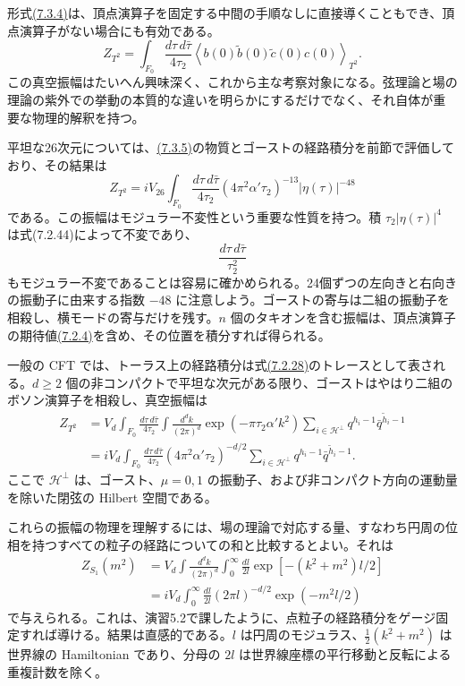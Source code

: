 形式\hyperref[eq:7.3.4]{(7.3.4)}は、頂点演算子を固定する中間の手順なしに直接導くこともでき、頂点演算子がない場合にも有効である。
\begin{equation}
Z_{T^2}
=\int_{F_0}\frac{d\tau\,d\bar\tau}{4\tau_2}
\left\langle b(0)\tilde b(0)\tilde c(0)c(0)\right\rangle_{T^2}.
\tag{7.3.5}\label{eq:7.3.5}
\end{equation}
この真空振幅はたいへん興味深く、これから主な考察対象になる。弦理論と場の理論の紫外での挙動の本質的な違いを明らかにするだけでなく、それ自体が重要な物理的解釈を持つ。

平坦な26次元については、\hyperref[eq:7.3.5]{(7.3.5)}の物質とゴーストの経路積分を前節で評価しており、その結果は
\begin{equation}
Z_{T^2}=iV_{26}\int_{F_0}\frac{d\tau\,d\bar\tau}{4\tau_2}
(4\pi^2\alpha'\tau_2)^{-13}|\eta(\tau)|^{-48}
\tag{7.3.6}\label{eq:7.3.6}
\end{equation}
である。この振幅はモジュラー不変性という重要な性質を持つ。積 $\tau_2|\eta(\tau)|^4$ は式(7.2.44)によって不変であり、
\begin{equation}
\frac{d\tau\,d\bar\tau}{\tau_2^2}
\tag{7.3.7}\label{eq:7.3.7}
\end{equation}
もモジュラー不変であることは容易に確かめられる。24個ずつの左向きと右向きの振動子に由来する指数 $-48$ に注意しよう。ゴーストの寄与は二組の振動子を相殺し、横モードの寄与だけを残す。$n$ 個のタキオンを含む振幅は、頂点演算子の期待値\hyperref[eq:7.2.4]{(7.2.4)}を含め、その位置を積分すれば得られる。

一般の CFT では、トーラス上の経路積分は式\hyperref[eq:7.2.28]{(7.2.28)}のトレースとして表される。$d\geq2$ 個の非コンパクトで平坦な次元がある限り、ゴーストはやはり二組のボソン演算子を相殺し、真空振幅は
\begin{align}
Z_{T^2}
&=V_d\int_{F_0}\frac{d\tau\,d\bar\tau}{4\tau_2}
\int\frac{d^dk}{(2\pi)^d}\exp(-\pi\tau_2\alpha'k^2)
\sum_{i\in\mathcal H^\perp}q^{h_i-1}\bar q^{\tilde h_i-1}
\tag{7.3.8a}\label{eq:7.3.8a}\\
&=iV_d\int_{F_0}\frac{d\tau\,d\bar\tau}{4\tau_2}
(4\pi^2\alpha'\tau_2)^{-d/2}
\sum_{i\in\mathcal H^\perp}q^{h_i-1}\bar q^{\tilde h_i-1}.
\tag{7.3.8b}\label{eq:7.3.8b}
\end{align}
ここで $\mathcal H^\perp$ は、ゴースト、$\mu=0,1$ の振動子、および非コンパクト方向の運動量を除いた閉弦の Hilbert 空間である。

これらの振幅の物理を理解するには、場の理論で対応する量、すなわち円周の位相を持つすべての粒子の経路についての和と比較するとよい。それは
\begin{equation}
\begin{aligned}
Z_{S_1}(m^2)
&=V_d\int\frac{d^dk}{(2\pi)^d}\int_0^\infty\frac{dl}{2l}
\exp[-(k^2+m^2)l/2]\\
&=iV_d\int_0^\infty\frac{dl}{2l}
(2\pi l)^{-d/2}\exp(-m^2l/2)
\end{aligned}
\tag{7.3.9}\label{eq:7.3.9}
\end{equation}
で与えられる。これは、演習5.2で課したように、点粒子の経路積分をゲージ固定すれば導ける。結果は直感的である。$l$ は円周のモジュラス、$\tfrac12(k^2+m^2)$ は世界線の Hamiltonian であり、分母の $2l$ は世界線座標の平行移動と反転による重複計数を除く。

